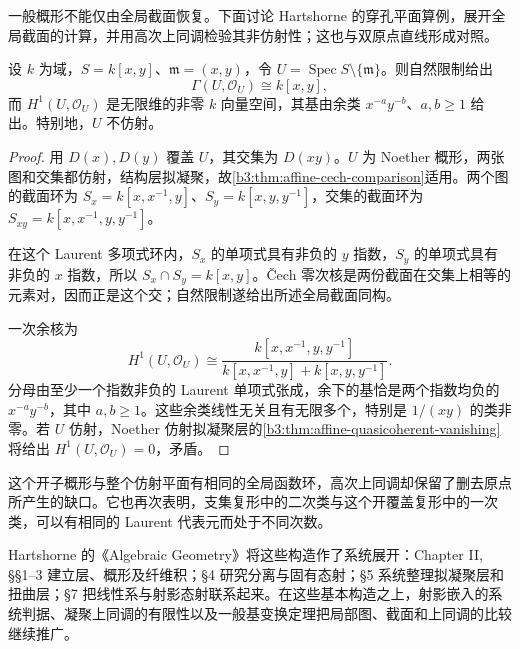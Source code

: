 \ProseParagraphBreak
一般概形不能仅由全局截面恢复。下面讨论 Hartshorne 的穿孔平面算例\cite[Chapter III, Exercise 4.3, p. 223]{Hartshorne1977}，展开全局截面的计算，并用高次上同调检验其非仿射性；这也与双原点直线形成对照。

\begin{example}\label{b3:exm:punctured-plane-global-functions}
	设 \(k\) 为域，\(S=k[x,y]\)、\(\mathfrak m=(x,y)\)，令 \(U=\operatorname{Spec}S\setminus\{\mathfrak m\}\)。则自然限制给出
	\[
		\Gamma(U,\mathcal O_U)\cong k[x,y],
	\]
	而 \(H^1(U,\mathcal O_U)\) 是无限维的非零 \(k\) 向量空间，其基由余类 \(x^{-a}y^{-b}\)、\(a,b\ge1\) 给出。特别地，\(U\) 不仿射。
\end{example}
\begin{proof}
	用 \(D(x),D(y)\) 覆盖 \(U\)，其交集为 \(D(xy)\)。\(U\) 为 Noether 概形，两张图和交集都仿射，结构层拟凝聚，故\cref{b3:thm:affine-cech-comparison}适用。两个图的截面环为 \(S_x=k[x,x^{-1},y]\)、\(S_y=k[x,y,y^{-1}]\)，交集的截面环为 \(S_{xy}=k[x,x^{-1},y,y^{-1}]\)。

	在这个 Laurent 多项式环内，\(S_x\) 的单项式具有非负的 \(y\) 指数，\(S_y\) 的单项式具有非负的 \(x\) 指数，所以 \(S_x\cap S_y=k[x,y]\)。Čech 零次核是两份截面在交集上相等的元素对，因而正是这个交；自然限制遂给出所述全局截面同构。

	一次余核为
	\[
		H^1(U,\mathcal O_U) \cong\frac{k[x,x^{-1},y,y^{-1}]}{k[x,x^{-1},y]+k[x,y,y^{-1}]}.
	\]
	分母由至少一个指数非负的 Laurent 单项式张成，余下的基恰是两个指数均负的 \(x^{-a}y^{-b}\)，其中 \(a,b\ge1\)。这些余类线性无关且有无限多个，特别是 \(1/(xy)\) 的类非零。若 \(U\) 仿射，Noether 仿射拟凝聚层的\cref{b3:thm:affine-quasicoherent-vanishing}将给出 \(H^1(U,\mathcal O_U)=0\)，矛盾。
\end{proof}

这个开子概形与整个仿射平面有相同的全局函数环，高次上同调却保留了删去原点所产生的缺口。它也再次表明，支集复形中的二次类与这个开覆盖复形中的一次类，可以有相同的 Laurent 代表元而处于不同次数。

\ProseParagraphBreak
Hartshorne 的《Algebraic Geometry》将这些构造作了系统展开：Chapter II, §§1--3 建立层、概形及纤维积；§4 研究分离与固有态射；§5 系统整理拟凝聚层和扭曲层；§7 把线性系与射影态射联系起来\cite[Chapter II, \S\S 1--5 and \S 7]{Hartshorne1977}。在这些基本构造之上，射影嵌入的系统判据、凝聚上同调的有限性以及一般基变换定理把局部图、截面和上同调的比较继续推广。
